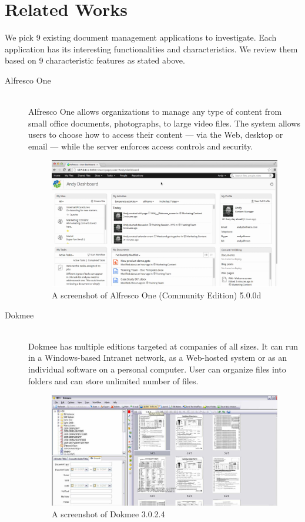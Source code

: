 \section{Related Works} \label{relate-works}
We pick 9 existing document management applications to investigate.
Each application has its interesting functionalities and characteristics.
We review them based on 9 characteristic features as stated above.

\begin{description}
\item[Alfresco One] \hfill \\
Alfresco One allows organizations to manage any type of content from small office documents, photographs, to large video files.
The system allows users to choose how to access their content --- via the Web, desktop or email --- while the server enforces access controls and security.
\begin{figure}[h]
	\centering
	\includegraphics[scale=0.4]{res/literature/screenshot_alfresco}
	\caption{A screenshot of Alfresco One (Community Edition) 5.0.0d }
\end{figure}

\item[Dokmee] \hfill \\
Dokmee has multiple editions targeted at companies of all sizes.
It can run in a Windows-based Intranet network, as a Web-hosted system or as an individual software on a personal computer.
User can organize files into folders and can store unlimited number of files.
\begin{figure}[h]
	\centering
	\includegraphics[scale=0.55]{res/literature/screenshot_dokmee}
	\caption{A screenshot of Dokmee 3.0.2.4 }
\end{figure}


\end{description}
